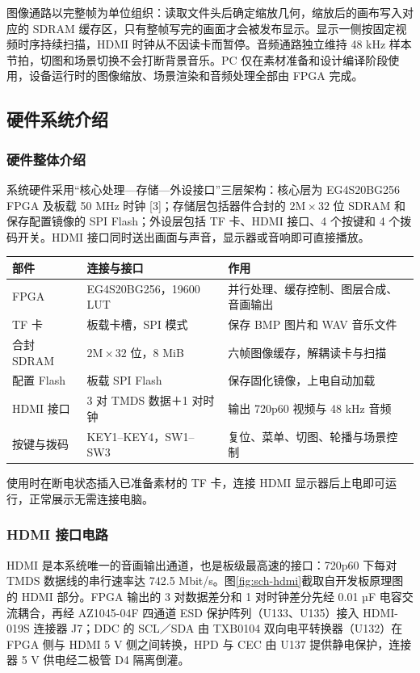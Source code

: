 图像通路以完整帧为单位组织：读取文件头后确定缩放几何，缩放后的画布写入对应的 SDRAM 缓存区，只有整帧写完的画面才会被发布显示。显示一侧按固定视频时序持续扫描，HDMI 时钟从不因读卡而暂停。音频通路独立维持 48 kHz 样本节拍，切图和场景切换不会打断背景音乐。PC 仅在素材准备和设计编译阶段使用，设备运行时的图像缩放、场景渲染和音频处理全部由 FPGA 完成。

\subsection{硬件系统介绍}
\subsubsection{硬件整体介绍}
系统硬件采用“核心处理—存储—外设接口”三层架构：核心层为 EG4S20BG256 FPGA 及板载 50 MHz 时钟 [3]；存储层包括器件合封的 $2\mathrm{M}\times32$ 位 SDRAM 和保存配置镜像的 SPI Flash；外设层包括 TF 卡、HDMI 接口、4 个按键和 4 个拨码开关。HDMI 接口同时送出画面与声音，显示器或音响即可直接播放。

\begin{center}\small
\begin{tabular}{p{3.0cm}p{4.2cm}p{6.2cm}}
\toprule
部件 & 连接与接口 & 作用\\\midrule
FPGA & EG4S20BG256，19600 LUT & 并行处理、缓存控制、图层合成、音画输出\\
TF 卡 & 板载卡槽，SPI 模式 & 保存 BMP 图片和 WAV 音乐文件\\
合封 SDRAM & $2\mathrm{M}\times32$ 位，8 MiB & 六帧图像缓存，解耦读卡与扫描\\
配置 Flash & 板载 SPI Flash & 保存固化镜像，上电自动加载\\
HDMI 接口 & 3 对 TMDS 数据＋1 对时钟 & 输出 720p60 视频与 48 kHz 音频\\
按键与拨码 & KEY1--KEY4，SW1--SW3 & 复位、菜单、切图、轮播与场景控制\\
\bottomrule
\end{tabular}
\end{center}
使用时在断电状态插入已准备素材的 TF 卡，连接 HDMI 显示器后上电即可运行，正常展示无需连接电脑。

\subsubsection{HDMI 接口电路}
HDMI 是本系统唯一的音画输出通道，也是板级最高速的接口：720p60 下每对 TMDS 数据线的串行速率达 742.5 Mbit/s。图\ref{fig:sch-hdmi}截取自开发板原理图的 HDMI 部分。FPGA 输出的 3 对数据差分和 1 对时钟差分先经 0.01 µF 电容交流耦合，再经 AZ1045-04F 四通道 ESD 保护阵列（U133、U135）接入 HDMI-019S 连接器 J7；DDC 的 SCL／SDA 由 TXB0104 双向电平转换器（U132）在 FPGA 侧与 HDMI 5 V 侧之间转换，HPD 与 CEC 由 U137 提供静电保护，连接器 5 V 供电经二极管 D4 隔离倒灌。

